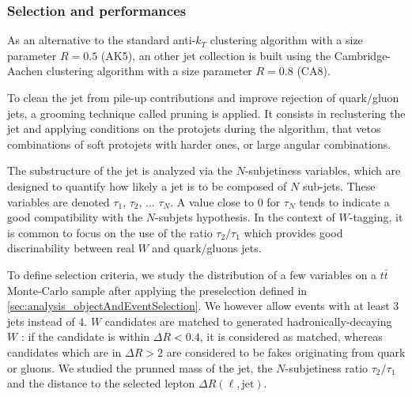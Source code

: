             \subsubsection{Selection and performances}

            As an alternative to the standard anti-$k_T$ clustering algorithm with a 
            size parameter $R = 0.5$ (AK5), an other jet collection is built using the 
            Cambridge-Aachen clustering algorithm with a size parameter $R = 0.8$ (CA8).

            To clean the jet from pile-up contributions and improve rejection of 
            quark/gluon jets, a grooming technique called pruning is applied. It 
            consists in reclustering the jet and applying 
            conditions on the protojets during the algorithm, that vetos combinations of
            soft protojets with harder ones, or large angular combinations. 
           
            The substructure of the jet is analyzed via the $N$-subjetiness variables,
            which are designed to quantify how likely a jet is to be composed of $N$
            sub-jets.  These variables are denoted $\tau_1$,
            $\tau_2$, ... $\tau_N$. A value close to 0 for $\tau_N$ tends to indicate
            a good compatibility with the $N$-subjets hypothesis. In the context of 
            $W$-tagging, it is common to focus on the use of the ratio $\tau_2/\tau_1$ 
            which provides good discrinability between real $W$ and quark/gluons jets.

            To define selection criteria, we study the distribution of a few variables
            on a $t\bar{t}$ Monte-Carlo sample after applying the preselection defined in 
            \ref{sec:analysis_objectAndEventSelection}. We however allow events with at 
            least 3 jets instead of 4. $W$ candidates are matched to generated 
            hadronically-decaying $W$ : if the candidate is within $\Delta R < 0.4$, it
            is considered as matched, whereas candidates which are in $\Delta R > 2$ are
            considered to be fakes originating from quark or gluons. We studied the 
            prunned mass of the jet, the $N$-subjetiness ratio $\tau_2 / \tau_1$ and the 
            distance to the selected lepton $\Delta R (\ell,\text{jet})$.

